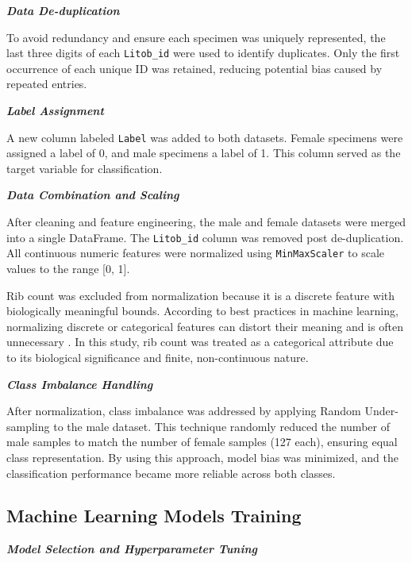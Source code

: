 \newpage
\textbf{\textit{Data De-duplication}}

To avoid redundancy and ensure each specimen was uniquely represented, the last three digits of each \texttt{Litob\_id} were used to identify duplicates. Only the first occurrence of each unique ID was retained, reducing potential bias caused by repeated entries.

\textbf{\textit{Label Assignment}}

A new column labeled \texttt{Label} was added to both datasets. Female specimens were assigned a label of 0, and male specimens a label of 1. This column served as the target variable for classification.

\textbf{\textit{Data Combination and Scaling}}

After cleaning and feature engineering, the male and female datasets were merged into a single DataFrame. The \texttt{Litob\_id} column was removed post de-duplication. All continuous numeric features were normalized using \texttt{MinMaxScaler} to scale values to the range [0, 1].

Rib count was excluded from normalization because it is a discrete feature with biologically meaningful bounds. According to best practices in machine learning, normalizing discrete or categorical features can distort their meaning and is often unnecessary \cite{jaiswal2024}. In this study, rib count was treated as a categorical attribute due to its biological significance and finite, non-continuous nature.

\textbf{\textit{Class Imbalance Handling}}

After normalization, class imbalance was addressed by applying Random Under-sampling to the male dataset. This technique randomly reduced the number of male samples to match the number of female samples (127 each), ensuring equal class representation. By using this approach, model bias was minimized, and the classification performance became more reliable across both classes.

\vspace{0.5cm}
\begin{minipage}{\linewidth}
	\subsection{Machine Learning Models Training}
\end{minipage}

\textbf{\textit{Model Selection and Hyperparameter Tuning}}

